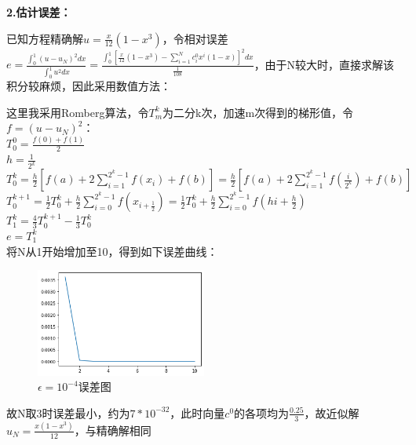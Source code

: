 \documentclass[UTF8]{ctexart}
\begin{document}
	\textbf{2.估计误差：}
	
		已知方程精确解$u=\frac{x}{12}(1-x^3)$，令相对误差$e=\frac{\int_0^1 (u-u_N)^2dx}{\int_0^1u^2dx}
		=\frac{\int_0^1 [\frac{x}{12}(1-x^3)-\sum_{i=1}^{N}c^0_i x^i(1-x)]^2 dx}{\frac{1}{108}}$，由于N较大时，直接求解该积分较麻烦，因此采用数值方法：
		
		这里我采用Romberg算法，令$T_m^k$为二分k次，加速m次得到的梯形值，令$f=(u-u_N)^2$：\\
		$T_0^0=\frac{f(0)+f(1)}{2}$\\
		$h=\frac{1}{2^k}$\\
		$T_0^k=\frac{h}{2}[f(a)+2\sum_{i=1}^{2^k-1}f(x_i)+f(b)]=\frac{h}{2}[f(a)+2\sum_{i=1}^{2^k-1}f(\frac{i}{2^k})+f(b)]$\\
		$T_0^{k+1}=\frac{1}{2}T_0^{k}+\frac{h}{2}\sum_{i=0}^{2^k-1}f(x_{i+\frac{1}{2}})=\frac{1}{2}T_0^{k}+\frac{h}{2}\sum_{i=0}^{2^k-1}f(hi+\frac{h}{2})$\\
		$T_1^k=\frac{4}{3}T_{0}^{k+1}-\frac{1}{3}T_{0}^k$\\
		$e=T_1^k$\\
		将N从1开始增加至10，得到如下误差曲线：
		\begin{figure}[H]
			\centering
			\includegraphics[width=0.5\textwidth]{err.png}
			\caption{$\epsilon=10^{-4}$误差图}
		\end{figure}
		故N取3时误差最小，约为$7*10^{-32}$，此时向量$c^0$的各项均为$\frac{0.25}{3}$，故近似解$u_N=\frac{x(1-x^3)}{12}$，与精确解相同
	
	
\end{document}
